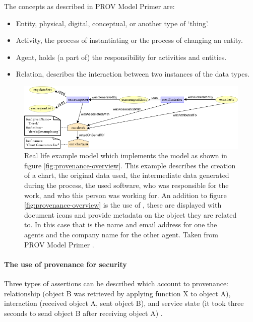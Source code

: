 The concepts as described in PROV Model Primer \cite{dsp8gil} are:

\begin{itemize}
	\item Entity, physical, digital, conceptual, or another type of `thing'.
	\item Activity, the process of instantiating or the process of changing an entity.
	\item Agent, holds (a part of) the responsibility for activities and entities.
	\item Relation, describes the interaction between two instances of the data types.
\end{itemize}

\begin{figure}[!b]
	\centering
	\includegraphics[width=1.0\linewidth]{images/provenance-large-schema}
	\caption{
		Real life example model which implements the model as shown in figure \ref{fig:provenance-overview}.
		This example describes the creation of a chart, the original data used, the intermediate data generated during the process, the used software, who was responsible for the work, and who this person was working for.
		An addition to figure \ref{fig:provenance-overview} is the use of \attributes{}, these are displayed with document icons and provide metadata on the object they are related to.
		In this case that is the name and email address for one the agents and the company name for the other agent.
		Taken from PROV Model Primer \cite{dsp8gil}.
		}
	\label{fig:provenance-large-schema}
\end{figure}

\paragraph{The use of provenance for security}
\label{provenance-use}

Three types of assertions can be described which account to provenance: relationship (object B was retrieved by applying function X to object A), interaction (received object A, sent object B), and service state (it took three seconds to send object B after receiving object A) \cite{dsp4moreau}.

